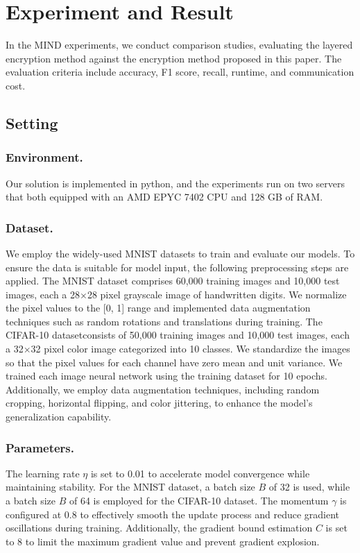 ﻿\documentclass[conference]{IEEEtran}
\providecommand{\DIFaddtex}[1]{{\protect\color{blue}\uwave{#1}}} %
\providecommand{\DIFaddbegin}{} %
\providecommand{\DIFaddend}{} %
\providecommand{\DIFadd}[1]{\texorpdfstring{\DIFaddtex{#1}}{#1}} %
\newcommand{\DIFaddincludegraphics}[2][]{{\color{blue}\fbox{\DIFOincludegraphics[#1]{#2}}}} %
\DeclareRobustCommand{\DIFaddbegin}{\DIFOaddbegin \let\includegraphics\DIFaddincludegraphics} %
\DeclareRobustCommand{\DIFaddend}{\DIFOaddend \let\includegraphics\DIFOincludegraphics} %
\begin{document}
\section{Experiment and Result}
In the MIND experiments, we conduct comparison studies, evaluating the layered encryption method against the encryption method proposed in this paper. The evaluation criteria include accuracy, F1 score, recall, runtime, and communication cost.

\subsection{Setting}
\subsubsection{Environment.} Our solution is implemented in python, and the experiments run on two servers that both equipped with an AMD EPYC 7402 CPU and 128 GB of RAM.
\subsubsection{Dataset.} 
We employ the widely-used MNIST datasets \cite{xiao2017fashion} to train and evaluate our models. To ensure the data is suitable for model input, the following preprocessing steps are applied. The MNIST dataset comprises 60,000 training images and 10,000 test images, each a 28$\times$28 pixel grayscale image of handwritten digits. We normalize the pixel values to the [0, 1] range and implemented data augmentation techniques such as random rotations and translations during training. The CIFAR-10 dataset\DIFaddbegin \DIFadd{\mbox{%
\cite{krizhevsky2009learning} }\hskip0pt%
}\DIFaddend consists of 50,000 training images and 10,000 test images, each a 32$\times$32 pixel color image categorized into 10 classes. We standardize the images so that the pixel values for each channel have zero mean and unit variance. We trained each image neural network using the training dataset for 10 epochs. Additionally, we employ data augmentation techniques, including random cropping, horizontal flipping, and color jittering, to enhance the model's generalization capability.




\subsubsection{Parameters.} 
The learning rate $\eta$ is set to 0.01 to accelerate model convergence while maintaining stability. For the MNIST dataset, a batch size $B$ of 32 is used, while a batch size $B$ of 64 is employed for the CIFAR-10 dataset. The momentum $\gamma$ is configured at 0.8 to effectively smooth the update process and reduce gradient oscillations during training. Additionally, the gradient bound estimation $C$ is set to 8 to limit the maximum gradient value and prevent gradient explosion.
\end{document}
